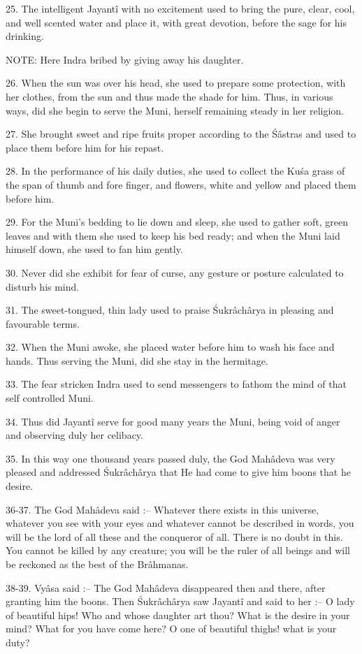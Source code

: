 25. The intelligent Jayant\^i with no excitement used to bring the pure, clear, cool, and well scented water and place it, with great devotion, before the sage for his drinking.

NOTE: Here Indra bribed by giving away his daughter.

26. When the sun was over his head, she used to prepare some protection, with her clothes, from the sun and thus made the shade for him. Thus, in various ways, did she begin to serve the Muni, herself remaining steady in her religion.

27. She brought sweet and ripe fruits proper according to the \'S\^astras and used to place them before him for his repast.

28. In the performance of his daily duties, she used to collect the Ku\'sa grass of the span of thumb and fore finger, and flowers, white and yellow and placed them before him.

29. For the Muni's bedding to lie down and sleep, she used to gather soft, green leaves and with them she used to keep his bed ready; and when the Muni laid himself down, she used to fan him gently.

30. Never did she exhibit for fear of curse, any gesture or posture calculated to disturb his mind.

31. The sweet-tongued, thin lady used to praise \'Sukr\^ach\^arya in pleasing and favourable terms.

32. When the Muni awoke, she placed water before him to wash his face and hands. Thus serving the Muni, did she stay in the hermitage.

33. The fear stricken Indra used to send messengers to fathom the mind of that self controlled Muni.

34. Thus did Jayant\^i serve for good many years the Muni, being void of anger and observing duly her celibacy.

35. In this way one thousand years passed duly, the God Mah\^adeva was very pleased and addressed \'Sukr\^ach\^arya that He had come to give him boons that he desire.

36-37. The God Mah\^adeva said :-- Whatever there exists in this universe, whatever you see with your eyes and whatever cannot be described in words, you will be the lord of all these and the conqueror of all. There is no doubt in this. You cannot be killed by any creature; you will be the ruler of all beings and will be reckoned as the best of the Br\^ahmanas.

38-39. Vy\^asa said :-- The God Mah\^adeva disappeared then and there, after granting him the boons. Then \'Sukr\^ach\^arya saw Jayant\^i and said to her :-- O lady of beautiful hips! Who and whose daughter art thou? What is the desire in your mind? What for you have come here? O one of beautiful thighs! what is your duty?

